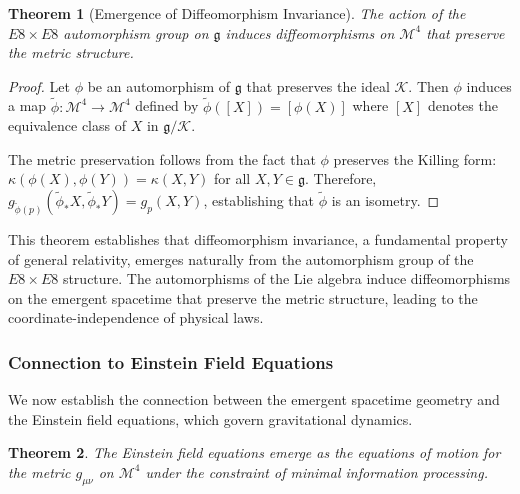 \documentclass[11pt,english,twoside]{article}
\newtheorem{theorem}{Theorem}
\begin{document}
\begin{theorem}[Emergence of Diffeomorphism Invariance]
The action of the $E8\times E8$ automorphism group on $\mathfrak{g}$ induces diffeomorphisms on $\mathcal{M}^4$ that preserve the metric structure.
\end{theorem}

\begin{proof}
Let $\phi$ be an automorphism of $\mathfrak{g}$ that preserves the ideal $\mathcal{K}$. Then $\phi$ induces a map $\tilde{\phi}: \mathcal{M}^4 \rightarrow \mathcal{M}^4$ defined by $\tilde{\phi}([X]) = [\phi(X)]$ where $[X]$ denotes the equivalence class of $X$ in $\mathfrak{g}/\mathcal{K}$.

The metric preservation follows from the fact that $\phi$ preserves the Killing form: $\kappa(\phi(X),\phi(Y)) = \kappa(X,Y)$ for all $X,Y \in \mathfrak{g}$. Therefore, $g_{\tilde{\phi}(p)}(\tilde{\phi}_* X, \tilde{\phi}_* Y) = g_p(X,Y)$, establishing that $\tilde{\phi}$ is an isometry.
\end{proof}

This theorem establishes that diffeomorphism invariance, a fundamental property of general relativity, emerges naturally from the automorphism group of the $E8\times E8$ structure. The automorphisms of the Lie algebra induce diffeomorphisms on the emergent spacetime that preserve the metric structure, leading to the coordinate-independence of physical laws.

\subsubsection{Connection to Einstein Field Equations}

We now establish the connection between the emergent spacetime geometry and the Einstein field equations, which govern gravitational dynamics.

\begin{theorem}
The Einstein field equations emerge as the equations of motion for the metric $g_{\mu\nu}$ on $\mathcal{M}^4$ under the constraint of minimal information processing.
\end{theorem}
\end{document}
